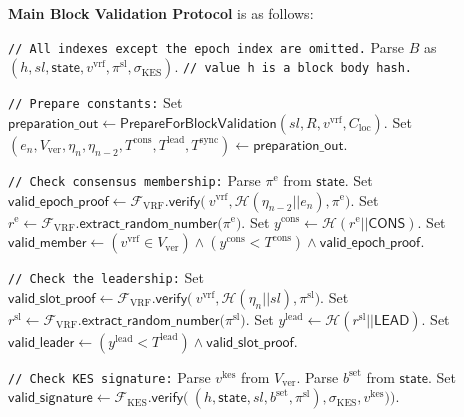\bigbreak
\bigbreak
\noindent
{}
\textbf{Main Block Validation Protocol}\label{apndx:block-validation-protocol} is as follows:
\begin{protocol}
    \caption{$\textsf{IsValidBlock}(P, R, B, C_{\text{loc}})$}
    \begin{algorithmic}[1]
        \noindent
        \lstinline|// All indexes except the epoch index are omitted.|
        \State Parse $B$ as ${(h, sl, \textsf{state}, v^{\text{vrf}}, \pi^{\text{sl}}, \sigma_{\text{KES}})}$. \lstinline|// value h is a block body hash.|

        \noindent
        \lstinline|// Prepare constants:|
        \State Set $\textsf{preparation\_out} \leftarrow \textsf{PrepareForBlockValidation}(sl, R, v^{\text{vrf}}, C_{\text{loc}})$.
        \State Set $(e_n, V_{\text{ver}}, \eta_{n}, \eta_{n - 2}, T^{\text{cons}}, T^{\text{lead}}, T^{\text{sync}}) \leftarrow \textsf{preparation\_out}$.

        \noindent
        \lstinline|// Check consensus membership:|
        \State Parse ${\pi^{\text{e}}}$ from $\textsf{state}$.
        \State Set $\textsf{valid\_epoch\_proof} \leftarrow \mathcal{F}_{\text{VRF}}\textsf{.verify(}\
        v^{\text{vrf}}, \mathcal{H}(\eta_{n - 2} || e_n),\pi^{\text{e}} \textsf{)}$.
        \State Set ${r^{\text{e}} \leftarrow \mathcal{F}_{\text{VRF}}\textsf{.extract\_random\_number(}\pi^{\text{e}}\textsf{)}}$.
        \State Set ${y^{\text{cons}} \leftarrow {\mathcal{H}(r^{\text{e}} || \textsf{CONS})}}$.
        \State Set ${\textsf{valid\_member} \leftarrow (v^{\text{vrf}} \in V_{\text{ver}}) \wedge (y^{\text{cons}} < T^{\text{cons}}) \wedge \textsf{valid\_epoch\_proof}}$.

        \noindent
        \lstinline|// Check the leadership:|
        \State Set $\textsf{valid\_slot\_proof} \leftarrow \mathcal{F}_{\text{VRF}}\textsf{.verify(}\
        v^{\text{vrf}}, \mathcal{H}(\eta_n || sl),\pi^{\text{sl}} \textsf{)}$.
        \State Set ${r^{\text{sl}} \leftarrow \mathcal{F}_{\text{VRF}}\textsf{.extract\_random\_number(}\pi^{\text{sl}}\textsf{)}}$.
        \State Set ${y^{\text{lead}} \leftarrow {\mathcal{H}(r^{\text{sl}} || \textsf{LEAD})}}$.
        \State Set ${\textsf{valid\_leader} \leftarrow (y^{\text{lead}} < T^{\text{lead}}) \wedge \textsf{valid\_slot\_proof}}$.

        \noindent
        \lstinline|// Check KES signature:|
        \State Parse $v^{\text{kes}}$ from $V_{\text{ver}}$.
        \State Parse $b^{\text{set}}$ from $\textsf{state}$.
        \State Set $\textsf{valid\_signature} \leftarrow \mathcal{F}_{\text{KES}}\textsf{.verify(}\
        (h, \textsf{state}, sl, b^{\text{set}}, \pi^{\text{sl}}), \sigma_{\text{KES}}, v^{\text{kes}}) \textsf{)}$.


\end{algorithmic}
\end{protocol}
